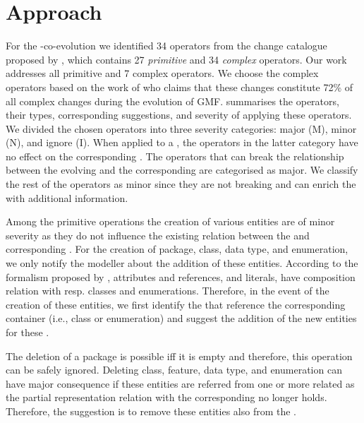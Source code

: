 \section{Approach} 
\label{sec:Approach}

For the \metamodel-\viewtype co-evolution we identified 34 operators from the change catalogue proposed by \cite{herrmannsdoerfer_extensive_2011}, which contains 27 \textit{primitive} and 34 \textit{complex} operators. Our work addresses all primitive and 7 complex operators. We choose the complex operators based on the work of \cite{khelladi_detecting_2015} who claims that these changes constitute 72\% of all complex changes during the evolution of GMF.  summarises the operators, their types, corresponding suggestions, and severity of applying these operators. We divided the chosen operators into three severity categories: major (M), minor (N), and ignore (I).
When applied to a \metamodel, the operators in the latter category have no effect on the corresponding \viewtypes. The operators that can break the relationship between the evolving \metamodel and the corresponding \viewtypes are categorised as major. We classify the rest of the operators as minor since they are not breaking and can enrich the \viewtypes with additional information.

Among the primitive operations the creation of various entities are of minor severity as they do not influence the existing relation between the \metamodel and corresponding \viewtypes. For the creation of package, class, data type, and enumeration, we only notify the modeller about the addition of these entities. 
According to the \metamodeling formalism proposed by \cite{herrmannsdoerfer_extensive_2011}, attributes and references, and literals, have composition relation with resp. classes and enumerations. Therefore, in the event of the creation of these entities, we first identify the \viewtypes that reference the corresponding container (i.e., class or enumeration) and suggest the addition of the new entities for these \viewtypes.

The deletion of a package is possible iff it is empty and therefore, this operation can be safely ignored. Deleting class, feature, data type, and enumeration can have major consequence if these entities are referred from one or more related \viewtypes as the partial representation relation with the corresponding \metamodel no longer holds. Therefore, the suggestion is to remove these entities also from the \viewtypes.

